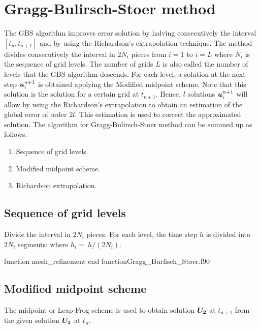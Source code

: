  \section{Gragg-Bulirsch-Stoer method}
The GBS algorithm improves error solution by halving  consecutively the interval 
$[t_n,t_{n+1}]$ and by using  the Richardson's extrapolation technique. 
The method divides consecutively the interval in $2 N_i$ pieces 
from $i=1 $ to $i =L$ where $N_i$ is the sequence of grid levels.
The number of grids $L$ is also called the number of levels that the GBS algorithm descends.
For each level, a solution at the next step $\boldsymbol{u}^{n+1}_i$ 
is obtained applying the Modified midpoint scheme. Note that this solution is 
the solution for a certain grid at $t_{n+1}$. 
Hence,  $l$ solutions $\boldsymbol{u}^{n+1}_i$ will allow by using the  Richardson's extrapolation to 
obtain an estimation of the global error of order $2l$. 
This estimation is used to correct the approximated solution. 
The algorithm for Gragg-Bulirsch-Stoer method can be summed up as follows:
\begin{enumerate}
\setlength\itemsep{-0.1cm}
\item  Sequence of grid levels.
\item  Modified midpoint scheme. 
\item Richardson extrapolation. 
\end{enumerate}
     
     
\subsection*{Sequence of grid levels}     
     
    
Divide the interval in $2N_i$ pieces.
For each level, the time step $ h $ is divided into  $2 N_i$ segments:
where $ h_i = \ h  / (2 N_i). $
     
     
{function mesh_refinement}
{end function}{Gragg_Burlisch_Stoer.f90}
      
     
     
     
\newpage   
\subsection*{Modified midpoint scheme}     
The midpoint or Leap-Frog scheme is used to obtain solution $ \boldsymbol{U_2} $ at $t_{n+1}$ 
from the given solution $ \boldsymbol{U_1} $ at $ t_n $.      
   
